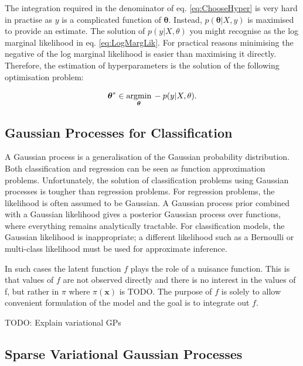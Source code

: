 \documentclass[12pt,a4paper]{report}
\theoremstyle{definition}
\begin{document}
The integration required in the denominator of eq. \ref{eq:ChooseHyper} is very hard in practise as $y$ is a complicated function of $\boldsymbol{\theta}$. 
Instead, $p(\boldsymbol{\theta} | X, y)$ is maximised to provide an estimate.
The solution of $p(y | X, \theta)$ you might recognise as the log marginal likelihood in eq. \ref{eq:LogMargLik}. 
For practical reasons minimising the negative of the log marginal likelihood is easier than maximising it directly.
Therefore, the estimation of hyperparameters is the solution of the following optimisation problem:

\begin{equation}
	\centering
	\boldsymbol{\theta}^* \in \underset{\boldsymbol{\theta}}{\textrm{argmin}} \, -p(y | X, \theta).
\end{equation}

\subsection{Gaussian Processes for Classification}

A Gaussian process is a generalisation of the Gaussian probability distribution. 
Both classification and regression can be seen as function approximation problems. 
Unfortunately, the solution of classification problems using Gaussian processes is tougher than regression problems. 
For regression problems, the likelihood is often assumed to be Gaussian. 
A Gaussian process prior combined with a Gaussian likelihood gives a posterior Gaussian process over functions, where everything remains analytically tractable. 
For classification models, the Gaussian likelihood is inappropriate; a different likelihood such as a Bernoulli or multi-class likelihood must be used for approximate inference.

In such cases the latent function $f$ plays the role of a nuisance function. 
This is that values of $f$ are not observed directly and there is no interest in the values of f, but rather in $\pi$ where $\pi (\textbf{x})$ is TODO.
The purpose of $f$ is solely to allow convenient formulation of the model and the goal is to integrate out $f$.

TODO: Explain variational GPs

\subsection{Sparse Variational Gaussian Processes}
\end{document}
